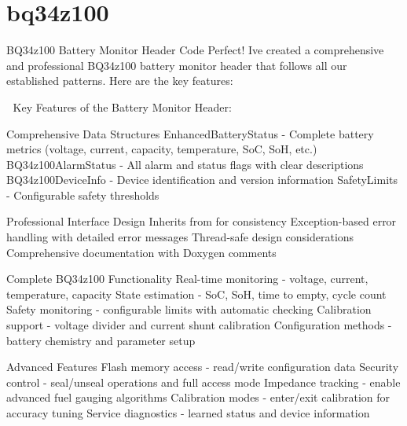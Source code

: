 \chapter{bq34z100 }
\hypertarget{md_bq34z100}{}\label{md_bq34z100}
BQ34z100 Battery Monitor Header Code Perfect! I\textquotesingle{}ve created a comprehensive and professional BQ34z100 battery monitor header that follows all our established patterns. Here are the key features\+:

🚀 Key Features of the Battery Monitor Header\+:
\begin{DoxyEnumerate}
\item Comprehensive Data Structures Enhanced\+Battery\+Status -\/ Complete battery metrics (voltage, current, capacity, temperature, SoC, SoH, etc.) BQ34z100\+Alarm\+Status -\/ All alarm and status flags with clear descriptions BQ34z100\+Device\+Info -\/ Device identification and version information Safety\+Limits -\/ Configurable safety thresholds
\item Professional Interface Design Inherits from  for consistency Exception-\/based error handling with detailed error messages Thread-\/safe design considerations Comprehensive documentation with Doxygen comments
\item Complete BQ34z100 Functionality Real-\/time monitoring -\/ voltage, current, temperature, capacity State estimation -\/ SoC, SoH, time to empty, cycle count Safety monitoring -\/ configurable limits with automatic checking Calibration support -\/ voltage divider and current shunt calibration Configuration methods -\/ battery chemistry and parameter setup
\item Advanced Features Flash memory access -\/ read/write configuration data Security control -\/ seal/unseal operations and full access mode Impedance tracking -\/ enable advanced fuel gauging algorithms Calibration modes -\/ enter/exit calibration for accuracy tuning Service diagnostics -\/ learned status and device information

\end{DoxyEnumerate}
